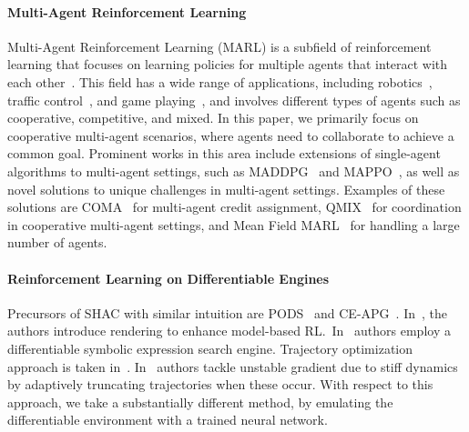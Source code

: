 \paragraph{Multi-Agent Reinforcement Learning}
Multi-Agent Reinforcement Learning (MARL) is a subfield of reinforcement learning that focuses on learning policies for multiple agents that interact with each other~\cite{albrecht2024multi}.
This field has a wide range of applications,
including robotics~\cite{DBLP:journals/air/ChungFYN24},
traffic control~\cite{DBLP:journals/tits/ChuWCL20},
and game playing~\cite{DBLP:conf/iclr/BakerKMWPMM20,jaderberg2019human},
and involves different types of agents such as cooperative, competitive, and mixed.
In this paper, we primarily focus on cooperative multi-agent scenarios,
where agents need to collaborate to achieve a common goal.
Prominent works in this area include extensions of single-agent algorithms to multi-agent settings,
such as MADDPG~\cite{DBLP:conf/nips/LoweWTHAM17} and MAPPO~\cite{DBLP:conf/nips/YuVVGWBW22},
as well as novel solutions to unique challenges in multi-agent settings. Examples of these solutions are COMA~\cite{DBLP:conf/aaai/FoersterFANW18} for multi-agent credit assignment,
QMIX~\cite{DBLP:conf/icml/RashidSWFFW18} for coordination in cooperative multi-agent settings,
and Mean Field MARL~\cite{DBLP:conf/icml/YangLLZZW18} for handling a large number of agents.

\paragraph{Reinforcement Learning on Differentiable Engines}
Precursors of SHAC with similar intuition are PODS~\cite{Mora21} and CE-APG~\cite{Gillen22}. In~\cite{Lv23}, the authors introduce rendering to enhance model-based RL\@.\ In~\cite{Zheng24} authors employ a differentiable symbolic expression search engine. Trajectory optimization approach is taken in~\cite{Wan24}. In~\cite{Georgiev24} authors tackle unstable gradient due to stiff dynamics by adaptively truncating trajectories when these occur. With respect to this approach, we take a substantially different method, by emulating the differentiable environment with a trained neural network.
